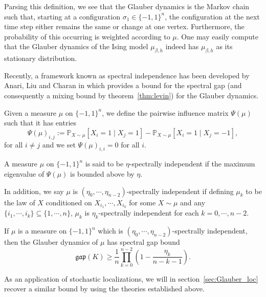 Parsing this definition, we see that the Glauber dynamics is the Markov chain such that, starting at a 
configuration \(\sigma_1 \in \{-1, 1\}^n\), the configuration at the next time step either remains the 
same or change at one vertex. Furthermore, the probability of this occurring is weighted according to 
\(\mu\). One may easily compute that the Glauber dynamics of the Ising model \(\mu_{\beta, h}\) indeed 
has \(\mu_{\beta, h}\) as its stationary distribution.

Recently, a framework known as spectral independence has been developed by Anari, Liu and Charan in 
\cite{Anari_2020} which provides a bound for the spectral gap (and consequently a mixing bound by 
theorem~\ref{thm:levin}) for the Glauber dynamics. 

\begin{definition}
  Given a measure \(\mu\) on \(\{-1, 1\}^n\), we define the pairwise influence matrix \(\Psi(\mu)\) 
  such that it has entries 
  \[\Psi(\mu)_{i, j} := \mathbb{P}_{X \sim \mu}[X_i = 1 \mid X_j = 1] - \mathbb{P}_{X \sim \mu}[X_i = 1 \mid X_j = -1],\]
  for all \(i \neq j\) and we set \(\Psi(\mu)_{i, i} = 0\) for all \(i\).
\end{definition}

\begin{definition}
  A measure \(\mu\) on \(\{-1, 1\}^n\) is said to be \(\eta\)-spectrally independent if 
  the maximum eigenvalue of \(\Psi(\mu)\) is bounded above by \(\eta\).

  In addition, we say \(\mu\) is \((\eta_0, \cdots, \eta_{n - 2})\)-spectrally independent if defining 
  \(\mu_k\) to be the law of \(X\) conditioned on \(X_{i_1}, \cdots, X_{i_k}\) for some \(X \sim \mu\) and 
  any \(\{i_1, \cdots, i_k\} \subseteq \{1, \cdots, n\}\), \(\mu_k\) is \(\eta_k\)-spectrally independent 
  for each \(k = 0, \cdots, n - 2\).
\end{definition}

\begin{theorem}\label{thm:Anari}
  If \(\mu\) is a measure on \(\{-1, 1\}^n\) which is \((\eta_0, \cdots, \eta_{n - 2})\)-spectrally 
  independent, then the Glauber dynamics of \(\mu\) has spectral gap bound 
  \[\mathfrak{gap}(K) \ge \frac{1}{n} \prod_{k = 0}^{n - 2}\left(1 - \frac{\eta_k}{n - k - 1}\right).\]
\end{theorem}

As an application of stochastic localizations, we will in section~\ref{sec:Glauber_loc} recover a similar
bound by using the theories established above.


